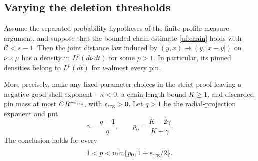 \subsection{Varying the deletion thresholds}
\begin{theorem}
\label{subquad:profile-theorem}
Assume the separated-probability hypotheses of the finite-profile measure
argument, and suppose that the bounded-chain estimate
\eqref{uf:chain} holds with \(\mathcal C<s-1\). Then the joint distance
law induced by \((y,x)\mapsto(y,|x-y|)\) on \(\nu\times\mu\) has a
density in \(L^p(d\nu\,dt)\) for some \(p>1\). In particular, its
pinned densities belong to \(L^p(dt)\) for \(\nu\)-almost every pin.

More precisely, make any fixed parameter choices in the strict proof
leaving a negative good-shell exponent \(-\kappa<0\), a chain-length
bound \(K\ge1\), and discarded pin mass at most
\(CR^{-\epsilon_{\rm reg}}\), with \(\epsilon_{\rm reg}>0\).
Let \(q>1\) be the radial-projection exponent and put
\[
 \gamma=\frac{q-1}{q},\qquad p_0=\frac{K+2\gamma}{K+\gamma}.
\]
The conclusion holds for every
\begin{equation}\label{subquad:p-range}
 1<p<\min\{p_0,1+\epsilon_{\rm reg}/2\}.
\end{equation}
\end{theorem}
